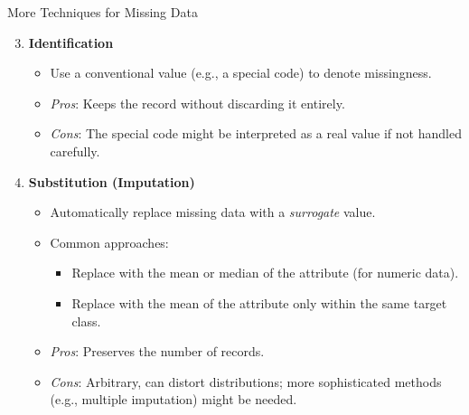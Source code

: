 \begin{frame}{More Techniques for Missing Data}
\begin{enumerate}
  \setcounter{enumi}{2} %

  \item \textbf{Identification}
    \begin{itemize}
      \item Use a conventional value (e.g., a special code) to denote missingness.
      \item \textit{Pros}: Keeps the record without discarding it entirely.
      \item \textit{Cons}: The special code might be interpreted as a real value if not handled carefully.
    \end{itemize}

  \vspace{0.3cm}

  \item \textbf{Substitution (Imputation)}
    \begin{itemize}
      \item Automatically replace missing data with a \textit{surrogate} value.
      \item Common approaches:
        \begin{itemize}
           \item Replace with the mean or median of the attribute (for numeric data).
           \item Replace with the mean of the attribute only within the same target class.
        \end{itemize}
      \item \textit{Pros}: Preserves the number of records.
      \item \textit{Cons}: Arbitrary, can distort distributions; more sophisticated methods (e.g., multiple imputation) might be needed.
    \end{itemize}

\end{enumerate}
\end{frame}

